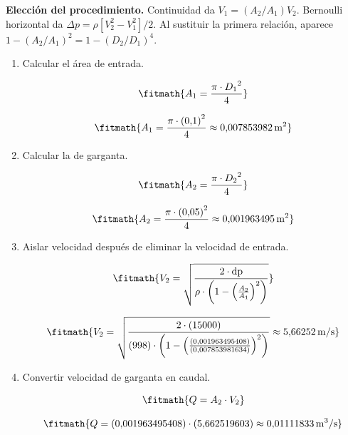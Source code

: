 \noindent\textbf{Elección del procedimiento.} Continuidad da $V_1=(A_2/A_1)V_2$. Bernoulli horizontal da $\Delta p=\rho[V_2^2-V_1^2]/2$. Al sustituir la primera relación, aparece $1-(A_2/A_1)^2=1-(D_2/D_1)^4$.

\begin{enumerate}

\item Calcular el área de entrada.

\[\fitmath{A_{1}=\frac{\pi\cdot {D_{1}}^{2}}{4}}\]

\[\fitmath{A_{1}=\frac{\pi\cdot {(0{,}1)}^{2}}{4}\approx 0{,}007853982\,\mathrm{m^{2}}}\]

\item Calcular la de garganta.

\[\fitmath{A_{2}=\frac{\pi\cdot {D_{2}}^{2}}{4}}\]

\[\fitmath{A_{2}=\frac{\pi\cdot {(0{,}05)}^{2}}{4}\approx 0{,}001963495\,\mathrm{m^{2}}}\]

\item Aislar velocidad después de eliminar la velocidad de entrada.

\[\fitmath{V_{2}=\sqrt{\frac{2\cdot \mathrm{dp}}{\rho\cdot \left(1-{\left(\frac{A_{2}}{A_{1}}\right)}^{2}\right)}}}\]

\[\fitmath{V_{2}=\sqrt{\frac{2\cdot (15000)}{(998)\cdot \left(1-{\left(\frac{(0{,}001963495408)}{(0{,}007853981634)}\right)}^{2}\right)}}\approx 5{,}66252\,\mathrm{m/s}}\]

\item Convertir velocidad de garganta en caudal.

\[\fitmath{Q=A_{2}\cdot V_{2}}\]

\[\fitmath{Q=(0{,}001963495408)\cdot (5{,}662519603)\approx 0{,}01111833\,\mathrm{m^{3}/s}}\]

\end{enumerate}
